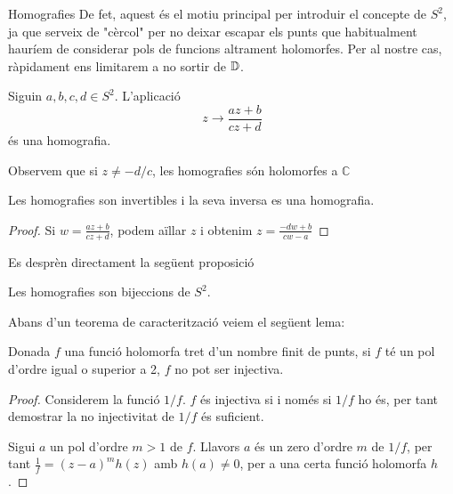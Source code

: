 \documentclass[dvipsnames, svgnames, leqno, a4paper, 12pt]{report}
\begin{document}
\begin{chapter}{Homografies}
        De fet, aquest és el motiu principal per introduir el concepte de \(S^2\), ja que serveix de "cèrcol" per no deixar escapar els punts que habitualment hauríem de considerar pols de funcions altrament holomorfes. Per al nostre cas, ràpidament ens limitarem a no sortir de \(\mathbb{D}\).


        \begin{definition}[Homografia]
            Siguin \(a,b,c,d\in S^2\). L'aplicació \begin{displaymath}
                z\to\frac{az+b}{cz+d}
            \end{displaymath}
            és una homografia.
        \end{definition}
        Observem que si \begin{math}
            z\neq -d/c
        \end{math}, les homografies són holomorfes a \begin{math}
            \mathbb{C}
        \end{math}
        \begin{proposition}
            Les homografies son invertibles i la seva inversa es una homografia.
        \end{proposition}
        \begin{proof}
            Si \begin{math}
                 w  = \frac{az+b}{cz+d} 
            \end{math}, podem aïllar $z$ i obtenim \begin{math}
                z = \frac{-d  w +b}{c w -a}
            \end{math}
        \end{proof}
        Es desprèn directament la següent proposició
        \begin{proposition}
            Les homografies son bijeccions de $S^2$.
        \end{proposition}
        Abans d'un teorema de caracterització veiem el següent lema:
        \begin{lemma}
            Donada $f$  una funció holomorfa tret d'un nombre finit de punts, si $f$ té un pol d'ordre igual o superior a 2, $f$ no pot ser injectiva.  
        \end{lemma}
        \begin{proof}
            Considerem la funció $1/f$. $f$ és injectiva si i només si $1/f$ ho és, per tant demostrar la no injectivitat de $1/f$ és suficient.
            
            Sigui $a$ un pol d'ordre $m>1$ de $f$. Llavors $a$ és un zero d'ordre $m$ de $1/f$, per tant \begin{math}
                \frac{1}{f}=(z-a)^mh(z)
            \end{math} amb $h(a)\neq0$, per a una certa funció holomorfa $h$.


\end{proof}
\end{chapter}
\end{document}
